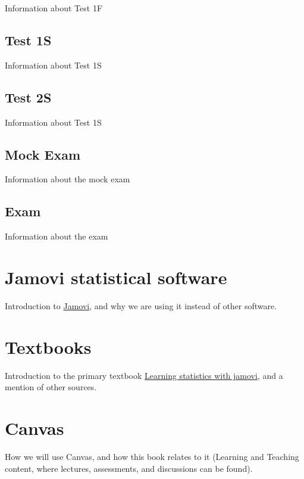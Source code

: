 \documentclass[
]{book}
\begin{document}
Information about Test 1F

\hypertarget{test-1s}{%
\subsection{Test 1S}\label{test-1s}}

Information about Test 1S

\hypertarget{test-2s}{%
\subsection{Test 2S}\label{test-2s}}

Information about Test 1S

\hypertarget{mock-exam}{%
\subsection{Mock Exam}\label{mock-exam}}

Information about the mock exam

\hypertarget{exam}{%
\subsection{Exam}\label{exam}}

Information about the exam

\hypertarget{jamovi-statistical-software}{%
\section{Jamovi statistical software}\label{jamovi-statistical-software}}

Introduction to \href{https://www.jamovi.org/}{Jamovi}, and why we are using it instead of other software.

\hypertarget{textbooks}{%
\section{Textbooks}\label{textbooks}}

Introduction to the primary textbook \href{https://www.learnstatswithjamovi.com/}{Learning statistics with jamovi}, and a mention of other sources.

\hypertarget{canvas}{%
\section{Canvas}\label{canvas}}

How we will use Canvas, and how this book relates to it (Learning and Teaching content, where lectures, assessments, and discussions can be found).
\end{document}
